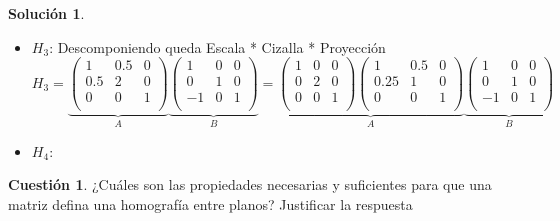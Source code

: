 \documentclass[a4paper, 11pt]{article}
\theoremstyle{definition}
\newtheorem{cuestion}{Cuestión}
\newtheorem*{solucion}{Solución}
\begin{document}
\begin{solucion}
\begin{itemize}
        \item $H_3$:
          Descomponiendo queda Escala * Cizalla * Proyección
          \[
          H_3 = \underbrace{
          \left(
          \begin{array}{ccc}
              1 & 0.5 & 0 \\
              0.5 & 2 & 0 \\
              0 & 0 & 1 \\
          \end{array}
          \right)}_{A}
          \underbrace{
          \left(
          \begin{array}{ccc}
              1 & 0 & 0 \\
              0 & 1 & 0 \\
              -1 & 0 & 1 \\
          \end{array}
          \right)}_{B} = \underbrace{\left(
                    \begin{array}{ccc}
                        1 & 0 & 0 \\
                        0 & 2 & 0 \\
                        0 & 0 & 1 \\
                    \end{array}
                    \right)
                    \left(
                    \begin{array}{ccc}
                        1 & 0.5 & 0 \\
                        0.25 & 1 & 0 \\
                        0 & 0 & 1 \\
                    \end{array}
                    \right)}_{A}
                    \underbrace{
                    \left(
                    \begin{array}{ccc}
                        1 & 0 & 0 \\
                        0 & 1 & 0 \\
                        -1 & 0 & 1 \\
                    \end{array}
                    \right)}_{B}
          \]

        \item $H_4$:
      \end{itemize}
  \end{solucion}

  \begin{cuestion}
    ¿Cuáles son las propiedades necesarias y suficientes para que una matriz
    defina una homografía entre planos? Justificar la respuesta
  \end{cuestion}
\end{document}
